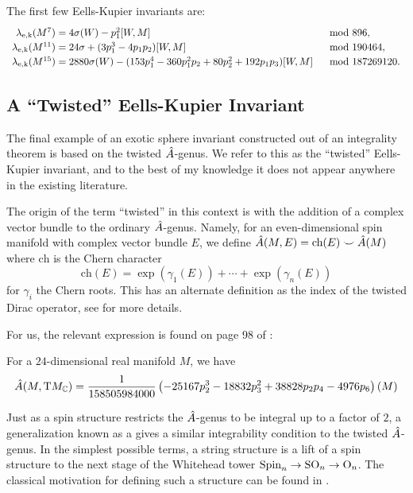 \begin{example}
	The first few Eells-Kupier invariants are:
	\[
		\renewcommand{\arraystretch}{1.2}
		\begin{array}{r@{\;}ll}
			\ekinv(M^7)
			 & = 4\sigma(W) - p_1^2[W, M]
			 & \mod 896,                                                        \\
			\ekinv(M^{11})
			 & = 24\sigma + (3p_1^3-4p_1p_2)[W,M]
			 & \mod 190464,                                                       \\
			\ekinv(M^{15})
			 & = 2880\sigma(W) - (153p_1^4-360p_1^2p_2+80p_2^2+192p_1p_3)[W,M]
			 & \mod 187269120.
		\end{array}
	\]
\end{example}

\subsection{A ``Twisted'' Eells-Kupier Invariant}

The final example of an exotic sphere invariant constructed out of an integrality theorem is based on the twisted $\hat{A}$-genus. We refer to this as the ``twisted'' Eells-Kupier invariant, and to the best of my knowledge it does not appear anywhere in the existing literature.

The origin of the term ``twisted'' in this context is with the addition of a complex vector bundle to the ordinary $\hat{A}$-genus. Namely, for an even-dimensional spin manifold with complex vector bundle $E$, we define $\hat{A}(M, E) = \textrm{ch}(E)\smile \hat{A}(M)$ where $\textrm{ch}$ is the Chern character 
\[
		\textrm{ch}(E) = \exp(\gamma_1(E))+\cdots +\exp(\gamma_n(E))
\]
for $\gamma_i$ the Chern roots. This has an alternate definition as the index of the twisted Dirac operator, see  for more details.

For us, the relevant expression is found on page 98 of \cite{hopkinsmahowald2002bo8}:
\begin{proposition}
	For a $24$-dimensional real manifold $M$, we have
	\[
		\hat{A}(M,\mathrm{T} M_{\mathbb{C}}) = \frac{1}{158505984000}\left(-25167p_2^3 - 18832p_3^2 + 38828p_2p_4 - 4976p_6\right)(M)
	\]
\end{proposition}

Just as a spin structure restricts the $\hat{A}$-genus to be integral up to a factor of $2$, a generalization known as a  gives a similar integrability condition to the twisted $\hat{A}$-genus. In the simplest possible terms, a string structure is a lift of a spin structure to the next stage of the Whitehead tower $\mathrm{Spin}_n \to \mathrm{SO}_n \to \mathrm{O}_n$. The classical motivation for defining such a structure can be found in \cite{witten1988string}.

